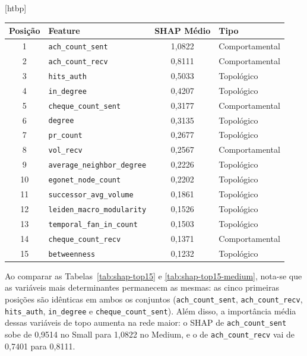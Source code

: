 \documentclass[a4paper,12pt,oneside,onecolumn,final,fleqn]{repUERJ}
\makeatletter
\renewenvironment{table}[1][htbp]
  {\@float{table}[#1]\centering}
  {\end@float}
\makeatother
\begin{document}
\begin{table}
    \centering
    \caption{Top 15 features por importância SHAP global (HI Medium)}
    \label{tab:shap-top15-medium}
    \begin{tabular}{clSl}
        \hline
        \textbf{Posição} & \textbf{Feature} & {\textbf{SHAP Médio}} & \textbf{Tipo} \\
         & \texttt{ach\_count\_sent} & 1,0822 & Comportamental \\
        2 & \texttt{ach\_count\_recv} & 0,8111 & Comportamental \\
        3 & \texttt{hits\_auth} & 0,5033 & Topológico \\
        4 & \texttt{in\_degree} & 0,4207 & Topológico \\
        5 & \texttt{cheque\_count\_sent} & 0,3177 & Comportamental \\
        6 & \texttt{degree} & 0,3135 & Topológico \\
        7 & \texttt{pr\_count} & 0,2677 & Topológico \\
        8 & \texttt{vol\_recv} & 0,2567 & Comportamental \\
        9 & \texttt{average\_neighbor\_degree} & 0,2226 & Topológico \\
        10 & \texttt{egonet\_node\_count} & 0,2202 & Topológico \\
        11 & \texttt{successor\_avg\_volume} & 0,1861 & Topológico \\
        12 & \texttt{leiden\_macro\_modularity} & 0,1526 & Topológico \\
        13 & \texttt{temporal\_fan\_in\_count} & 0,1503 & Topológico \\
        14 & \texttt{cheque\_count\_recv} & 0,1371 & Comportamental \\
        15 & \texttt{betweenness} & 0,1232 & Topológico \\
        \hline
    \end{tabular}
\end{table}

Ao comparar as Tabelas~\ref{tab:shap-top15} e \ref{tab:shap-top15-medium}, nota-se que as variáveis mais determinantes permanecem as mesmas: as cinco primeiras posições são idênticas em ambos os conjuntos (\texttt{ach\_count\_sent}, \texttt{ach\_count\_recv}, \texttt{hits\_auth}, \texttt{in\_degree} e \texttt{cheque\_count\_sent}). Além disso, a importância média dessas variáveis de topo aumenta na rede maior: o SHAP de \texttt{ach\_count\_sent} sobe de 0,9514 no Small para 1,0822 no Medium, e o de \texttt{ach\_count\_recv} vai de 0,7401 para 0,8111.
\end{document}
